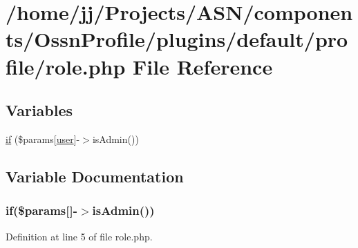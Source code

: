 \hypertarget{role_8php}{}\section{/home/jj/\+Projects/\+A\+S\+N/components/\+Ossn\+Profile/plugins/default/profile/role.php File Reference}
\label{role_8php}
\subsection*{Variables}
\begin{DoxyCompactItemize}
\item 
\hyperlink{role_8php_a7b0b53e8e9db4fc0d122b92fc2e265ae}{if} (\$params\mbox{[}\textquotesingle{}\hyperlink{ossn_8config_8db_8example_8php_a802544b7ba9f79bbf24ef67773d53bed}{user}\textquotesingle{}\mbox{]}-\/$>$is\+Admin())
\end{DoxyCompactItemize}


\subsection{Variable Documentation}
\subsubsection[{\texorpdfstring{if}{if}}]{\setlength{\rightskip}{0pt plus 5cm}if(\$params\mbox{[}\textquotesingle{}\mbox{]}-\/$>$is\+Admin())}\hypertarget{role_8php_a7b0b53e8e9db4fc0d122b92fc2e265ae}{}\label{role_8php_a7b0b53e8e9db4fc0d122b92fc2e265ae}


Definition at line 5 of file role.\+php.

